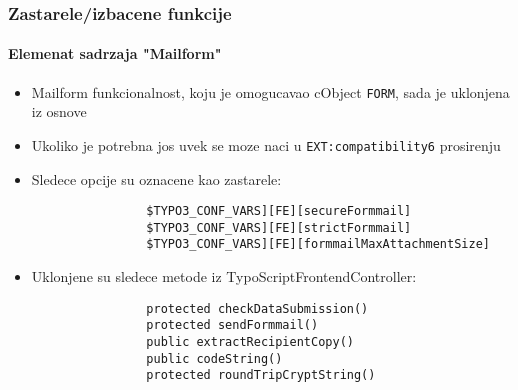 
\begin{frame}[fragile]
	\frametitle{Zastarele/izbacene funkcije}
	\framesubtitle{Elemenat sadrzaja "Mailform"}

	\begin{itemize}

		\item Mailform funkcionalnost, koju je omogucavao cObject \texttt{FORM}, sada je uklonjena iz osnove

		\item Ukoliko je potrebna jos uvek se moze naci u \texttt{EXT:compatibility6} prosirenju

		\item Sledece opcije su oznacene kao zastarele:

			\begin{lstlisting}
				$TYPO3_CONF_VARS][FE][secureFormmail]
				$TYPO3_CONF_VARS][FE][strictFormmail]
				$TYPO3_CONF_VARS][FE][formmailMaxAttachmentSize]
			\end{lstlisting}

		\item Uklonjene su sledece metode iz TypoScriptFrontendController:

			\begin{lstlisting}
				protected checkDataSubmission()
				protected sendFormmail()
				public extractRecipientCopy()
				public codeString()
				protected roundTripCryptString()
			\end{lstlisting}

	\end{itemize}

\end{frame}


